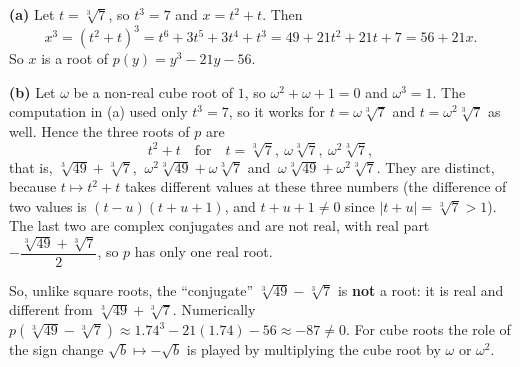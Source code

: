 \textbf{(a)} Let $t=\sqrt[3]{7}$, so $t^3=7$ and $x=t^2+t$. Then
\[
x^3=(t^2+t)^3=t^6+3t^5+3t^4+t^3=49+21t^2+21t+7=56+21x .
\]
So $x$ is a root of $\boxed{p(y)=y^3-21y-56}$.

\textbf{(b)} Let $\omega$ be a non-real cube root of $1$, so $\omega^2+\omega+1=0$ and $\omega^3=1$. The computation in (a) used only $t^3=7$, so it works for $t=\omega\sqrt[3]{7}$ and $t=\omega^2\sqrt[3]{7}$ as well. Hence the three roots of $p$ are
\[
t^2+t\quad\text{for}\quad t=\sqrt[3]7,\ \omega\sqrt[3]7,\ \omega^2\sqrt[3]7,
\]
that is, $\sqrt[3]{49}+\sqrt[3]{7}$, $\ \omega^2\sqrt[3]{49}+\omega\sqrt[3]{7}$ and $\ \omega\sqrt[3]{49}+\omega^2\sqrt[3]{7}$. They are distinct, because $t\mapsto t^2+t$ takes different values at these three numbers (the difference of two values is $(t-u)(t+u+1)$, and $t+u+1\neq0$ since $|t+u|=\sqrt[3]7>1$). The last two are complex conjugates and are not real, with real part $-\dfrac{\sqrt[3]{49}+\sqrt[3]{7}}{2}$, so $p$ has only one real root.

So, unlike square roots, the ``conjugate'' $\sqrt[3]{49}-\sqrt[3]{7}$ is \textbf{not} a root: it is real and different from $\sqrt[3]{49}+\sqrt[3]7$. Numerically $p\!\left(\sqrt[3]{49}-\sqrt[3]{7}\right)\approx 1.74^3-21(1.74)-56\approx-87\neq0$. For cube roots the role of the sign change $\sqrt b\mapsto-\sqrt b$ is played by multiplying the cube root by $\omega$ or $\omega^2$.
